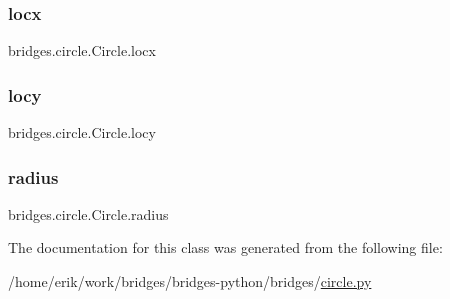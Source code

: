\subsubsection{\texorpdfstring{locx}{locx}}
{\footnotesize\ttfamily bridges.\+circle.\+Circle.\+locx}

\mbox{\label{classbridges_1_1circle_1_1_circle_a2f2e3b85639957633057eb0d0bbdd190}} 
\subsubsection{\texorpdfstring{locy}{locy}}
{\footnotesize\ttfamily bridges.\+circle.\+Circle.\+locy}

\mbox{\label{classbridges_1_1circle_1_1_circle_ab52ae32c28ea4175b815a7b04491205b}} 
\subsubsection{\texorpdfstring{radius}{radius}}
{\footnotesize\ttfamily bridges.\+circle.\+Circle.\+radius}



The documentation for this class was generated from the following file\+:\begin{DoxyCompactItemize}
\item 
/home/erik/work/bridges/bridges-\/python/bridges/\hyperlink{circle_8py}{circle.\+py}\end{DoxyCompactItemize}
